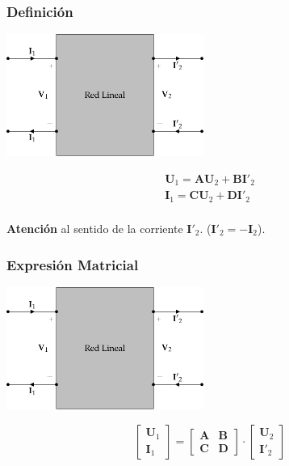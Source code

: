 \subsubsection{Definición}
\label{sec:orgcd755d3}

\includegraphics[height=4cm]{../figs/cuadripolo_transmision.pdf}


\[
\begin{array}{l}
  \mathbf{U}_1 = \mathbf{A} \mathbf{U}_2 + \mathbf{B}\mathbf{I'}_2\\
  \mathbf{I}_1 = \mathbf{C} \mathbf{U}_2 + \mathbf{D} \mathbf{I'}_2\\
\end{array}
\]


\textbf{Atención} al sentido de la corriente \(\mathbf{I'}_2\). (\(\mathbf{I'}_2 = - \mathbf{I}_2\)).


\subsubsection{Expresión Matricial}
\label{sec:org104daf9}

\includegraphics[height=4cm]{../figs/cuadripolo_transmision.pdf}


\[
  \left[
    \begin{array}{c}
      \mathbf{U}_1\\
      \mathbf{I}_1
    \end{array}
  \right] =
  \left[
    \begin{array}{cc}
      \mathbf{A} & \mathbf{B}\\
      \mathbf{C} & \mathbf{D}
    \end{array}
  \right] \cdot
  \left[
    \begin{array}{c}
      \mathbf{U}_2\\
      \mathbf{I'}_2
    \end{array}
  \right]
\]

